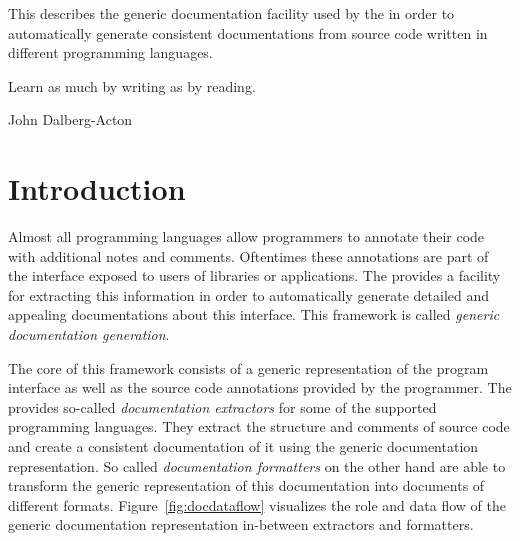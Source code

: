 




\renewcommand{\seedocumentation}{}

{This \documentation{} describes the generic documentation facility used by the \ecs{} in order
to automatically generate consistent documentations from source code written in different programming languages.}

\epigraph{Learn as much by writing as by reading.}{John Dalberg-Acton}

\section{Introduction}

Almost all programming languages allow programmers to annotate their code with additional notes and comments.
Oftentimes these annotations are part of the interface exposed to users of libraries or applications.
The \ecs{} provides a facility for extracting this information in order to automatically generate detailed and appealing documentations about this interface.
This framework is called \emph{generic documentation generation}.

The core of this framework consists of a generic representation of the program interface as well as the source code annotations provided by the programmer.
The \ecs{} provides so-called \emph{documentation extractors} for some of the supported programming languages.
They extract the structure and comments of source code and create a consistent documentation of it using the generic documentation representation.
So called \emph{documentation formatters} on the other hand are able to transform the generic representation of this documentation into documents of different formats.
Figure~\ref{fig:docdataflow} visualizes the role and data flow of the generic documentation representation in-between extractors and formatters.

